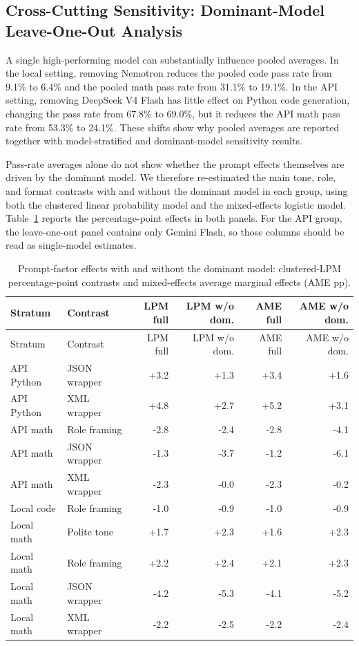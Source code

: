 \documentclass[a4paper,fleqn]{cas-sc}
\begin{document}
\subsection{Cross-Cutting Sensitivity: Dominant-Model Leave-One-Out Analysis}\label{dominant-model-sensitivity-and-aggregation-risk}

A single high-performing model can substantially influence pooled averages. In the local setting, removing Nemotron reduces the pooled code pass rate from 9.1\% to 6.4\% and the pooled math pass rate from 31.1\% to 19.1\%. In the API setting, removing DeepSeek V4 Flash has little effect on Python code generation, changing the pass rate from 67.8\% to 69.0\%, but it reduces the API math pass rate from 53.3\% to 24.1\%. These shifts show why pooled averages are reported together with model-stratified and dominant-model sensitivity results.

Pass-rate averages alone do not show whether the prompt effects themselves are driven by the dominant model. We therefore re-estimated the main tone, role, and format contrasts with and without the dominant model in each group, using both the clustered linear probability model and the mixed-effects logistic model. Table~\ref{tab:dominant-effects} reports the percentage-point effects in both panels. For the API group, the leave-one-out panel contains only Gemini Flash, so those columns should be read as single-model estimates.

\begin{longtable}[]{@{}llrrrr@{}}
\caption{Prompt-factor effects with and without the dominant model: clustered-LPM percentage-point contrasts and mixed-effects average marginal effects (AME pp).}\label{tab:dominant-effects}\tabularnewline
\toprule\noalign{}
Stratum & Contrast & LPM full & LPM w/o dom. & AME full & AME w/o dom. \\
\midrule\noalign{}
\endfirsthead
\toprule\noalign{}
Stratum & Contrast & LPM full & LPM w/o dom. & AME full & AME w/o dom. \\
\midrule\noalign{}
\endhead
\bottomrule\noalign{}
\endlastfoot
API Python & JSON wrapper & +3.2 & +1.3 & +3.4 & +1.6 \\
API Python & XML wrapper & +4.8 & +2.7 & +5.2 & +3.1 \\
API math & Role framing & -2.8 & -2.4 & -2.8 & -4.1 \\
API math & JSON wrapper & -1.3 & -3.7 & -1.2 & -6.1 \\
API math & XML wrapper & -2.3 & -0.0 & -2.3 & -0.2 \\
Local code & Role framing & -1.0 & -0.9 & -1.0 & -0.9 \\
Local math & Polite tone & +1.7 & +2.3 & +1.6 & +2.3 \\
Local math & Role framing & +2.2 & +2.4 & +2.1 & +2.3 \\
Local math & JSON wrapper & -4.2 & -5.3 & -4.1 & -5.2 \\
Local math & XML wrapper & -2.2 & -2.5 & -2.2 & -2.4 \\
\end{longtable}
\end{document}
